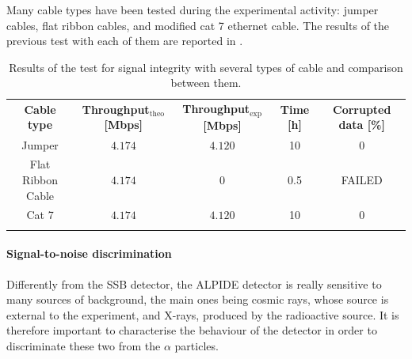 \documentclass[../../main/main.tex]{subfiles}
\begin{document}
Many cable types have been tested during the experimental activity: jumper cables, flat ribbon cables, and modified cat 7 ethernet cable. The results of the previous test with each of them are reported in .


\begin{table}[!h]
    \centering
    \begin{tabular}{c|cccc}
        \toprule
        \textbf{Cable type}    & \textbf{Throughput$_{\mathrm{theo}}$ [Mbps]}   & \textbf{Throughput$_{\mathrm{exp}}$ [Mbps]}  &  \textbf{Time [h]}  & \textbf{Corrupted data [\%]}   \\
        \colrule
        Jumper            & $4.174$   & $4.120$   & 10  & $0$    \\
        Flat Ribbon Cable & $4.174$   & $0$       & 0.5 & FAILED \\
        Cat 7             & $4.174$   & $4.120$   & 10  & $0$    \\
        \botrule
    \end{tabular}
    \caption{Results of the test for signal integrity with several types of cable and comparison between them.}
    \label{tab:Cable}
\end{table}


\paragraph{Signal-to-noise discrimination}
Differently from the SSB detector, the ALPIDE detector is really sensitive to many sources of background, the main ones being cosmic rays, whose source is external to the experiment, and X-rays, produced by the radioactive source. It is therefore important to characterise the behaviour of the detector in order to discriminate these two from the \( \alpha \) particles.
\end{document}

